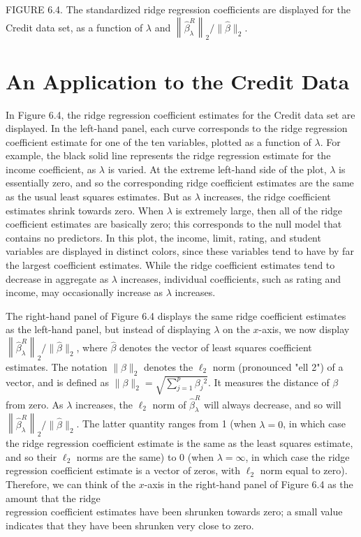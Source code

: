 \documentclass[10pt]{article}
\begin{document}
FIGURE 6.4. The standardized ridge regression coefficients are displayed for the Credit data set, as a function of $\lambda$ and $\left\|\hat{\beta}_{\lambda}^{R}\right\|_{2} /\|\hat{\beta}\|_{2}$.

\section*{An Application to the Credit Data}
In Figure 6.4, the ridge regression coefficient estimates for the Credit data set are displayed. In the left-hand panel, each curve corresponds to the ridge regression coefficient estimate for one of the ten variables, plotted as a function of $\lambda$. For example, the black solid line represents the ridge regression estimate for the income coefficient, as $\lambda$ is varied. At the extreme left-hand side of the plot, $\lambda$ is essentially zero, and so the corresponding ridge coefficient estimates are the same as the usual least squares estimates. But as $\lambda$ increases, the ridge coefficient estimates shrink towards zero. When $\lambda$ is extremely large, then all of the ridge coefficient estimates are basically zero; this corresponds to the null model that contains no predictors. In this plot, the income, limit, rating, and student variables are displayed in distinct colors, since these variables tend to have by far the largest coefficient estimates. While the ridge coefficient estimates tend to decrease in aggregate as $\lambda$ increases, individual coefficients, such as rating and income, may occasionally increase as $\lambda$ increases.

The right-hand panel of Figure 6.4 displays the same ridge coefficient estimates as the left-hand panel, but instead of displaying $\lambda$ on the $x$-axis, we now display $\left\|\hat{\beta}_{\lambda}^{R}\right\|_{2} /\|\hat{\beta}\|_{2}$, where $\hat{\beta}$ denotes the vector of least squares coefficient estimates. The notation $\|\beta\|_{2}$ denotes the $\ell_{2}$ norm (pronounced "ell 2") of a vector, and is defined as $\|\beta\|_{2}=\sqrt{\sum_{j=1}^{p} \beta_{j}{ }^{2}}$. It measures the distance of $\beta$ from zero. As $\lambda$ increases, the $\ell_{2}$ norm of $\hat{\beta}_{\lambda}^{R}$ will always decrease, and so will $\left\|\hat{\beta}_{\lambda}^{R}\right\|_{2} /\|\hat{\beta}\|_{2}$. The latter quantity ranges from 1 (when $\lambda=0$, in which case the ridge regression coefficient estimate is the same as the least squares estimate, and so their $\ell_{2}$ norms are the same) to 0 (when $\lambda=\infty$, in which case the ridge regression coefficient estimate is a vector of zeros, with $\ell_{2}$ norm equal to zero). Therefore, we can think of the $x$-axis in the right-hand panel of Figure 6.4 as the amount that the ridge\\
regression coefficient estimates have been shrunken towards zero; a small value indicates that they have been shrunken very close to zero.
\end{document}
